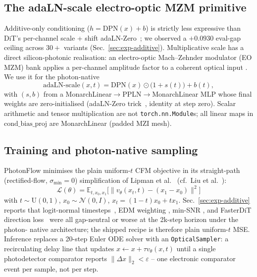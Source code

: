 \documentclass[conference]{IEEEtran}
\begin{document}
\subsection{The adaLN-scale electro-optic MZM primitive}
\label{sec:method-mzm}
Additive-only conditioning ($h\!=\!\mathrm{DPN}(x)\!+\!b$) is
strictly less expressive than DiT's per-channel scale + shift
adaLN-Zero~\cite{peebles2023}; we observed a $+0.0930$ eval-gap
ceiling across $30+$ variants
(Sec.~\ref{sec:exp-additive}).  Multiplicative scale has a direct
silicon-photonic realisation: an electro-optic Mach--Zehnder
modulator (EO MZM) bank applies a per-channel amplitude factor to
a coherent optical input \cite{shen2017,clements2016}.  We use it
for the photon-native
\begin{equation}
\mathrm{adaLN\text{-}scale}(x,t) = \mathrm{DPN}(x)\!\odot\!\bigl(1+s(t)\bigr)+b(t),
\end{equation}
with $(s,b)$ from a MonarchLinear$\to$PPLN$\to$MonarchLinear MLP
whose final weights are zero-initialised (adaLN-Zero
trick~\cite{peebles2023}, identity at step zero).  Scalar
arithmetic and tensor multiplication are not
\texttt{torch.nn.Module}s; all linear maps in
$\mathrm{cond\_bias\_proj}$ are MonarchLinear (padded MZI mesh).

\subsection{Training and photon-native sampling}
\label{sec:method-train}
PhotonFlow minimises the plain uniform-$t$ CFM objective in its
straight-path (rectified-flow, $\sigma_{\min}\!=\!0$) simplification
of Lipman et al.~\cite{lipman2023}
(cf.\ Liu et al.~\cite{liu2022rf}):
\begin{equation}
\mathcal{L}(\theta) =
\mathbb{E}_{t,x_0,x_1}\!\bigl[\|v_\theta(x_t,t) - (x_1-x_0)\|^2\bigr]
\label{eq:cfm}
\end{equation}
with $t\!\sim\!\mathrm{U}(0,1)$, $x_0\!\sim\!\mathcal{N}(0,I)$,
$x_t{=}(1\!-\!t)x_0{+}tx_1$.  Sec.~\ref{sec:exp-additive} reports
that logit-normal timesteps~\cite{esser2024}, EDM weighting
\cite{karras2022edm}, min-SNR \cite{hang2023minsnr}, and
FasterDiT direction loss~\cite{fasterdit2024} were all
gap-neutral or worse at the 2k-step horizon under the photon-
native architecture; the shipped recipe is therefore plain
uniform-$t$ MSE.  Inference replaces a 20-step Euler ODE
solver with an \texttt{OpticalSampler}: a recirculating delay line
that updates $x{\leftarrow}x{+}\tau v_\theta(x,t)$ until a single
photodetector comparator reports $\|\Delta x\|_2{<}\varepsilon$ --
one electronic comparator event per sample, not per step.
\end{document}
